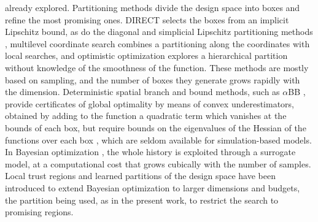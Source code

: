 \documentclass[pdflatex,sn-basic]{sn-jnl}
\begin{document}
already explored. Partitioning
methods divide the design space into boxes and refine the most promising ones.
DIRECT \citep{jones1993} selects the boxes from an implicit Lipschitz bound,
as do the diagonal and simplicial Lipschitz partitioning methods
\citep{sergeyev2017,paulavicius2014},
multilevel coordinate search \citep{huyer1999} combines a partitioning along the
coordinates with local searches, and optimistic optimization \citep{munos2011}
explores a hierarchical partition without knowledge of the smoothness of the
function. These methods are mostly based on sampling, and the number of boxes
they generate grows rapidly with the dimension. Deterministic spatial branch and
bound methods, such as $\alpha$BB \citep{androulakis1995,adjiman1998}, provide
certificates of global optimality by means of convex underestimators, obtained
by adding to the function a quadratic term which vanishes at the bounds of each
box, but require bounds on the eigenvalues of the Hessian of the functions over
each box
\citep{horst1996}, which are seldom available for simulation-based models. In
Bayesian optimization \citep{jones1998}, the whole history is exploited through
a surrogate model, at a computational cost that grows cubically with the number
of samples. Local trust regions \citep{eriksson2019} and learned partitions of
the design space \citep{wang2020} have been introduced to extend Bayesian
optimization to larger dimensions and budgets, the partition being used, as in
the present work, to restrict the search to promising regions.
\end{document}
